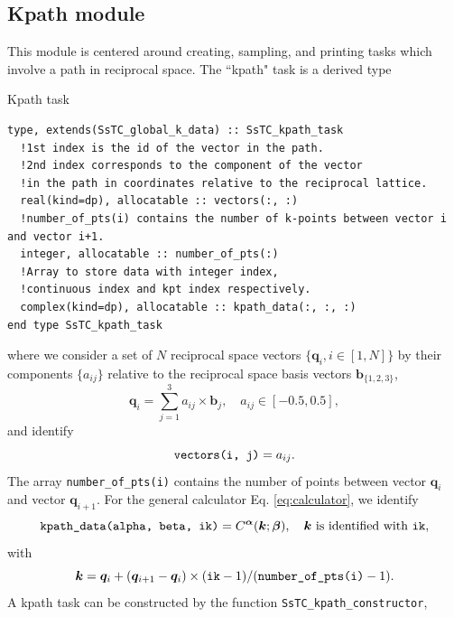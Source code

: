 \documentclass[10pt,a4paper]{article}
\begin{document}
\subsection{Kpath module}
This module is centered around creating, sampling, and printing tasks which involve a path in reciprocal space. The ``kpath" task is a derived type
\begin{codebox}{Kpath task}
\begin{lstlisting}[caption={Derived type corresponding to a ``kpath" task.},captionpos=b]
type, extends(SsTC_global_k_data) :: SsTC_kpath_task
  !1st index is the id of the vector in the path.
  !2nd index corresponds to the component of the vector
  !in the path in coordinates relative to the reciprocal lattice.
  real(kind=dp), allocatable :: vectors(:, :)
  !number_of_pts(i) contains the number of k-points between vector i and vector i+1.
  integer, allocatable :: number_of_pts(:)
  !Array to store data with integer index,
  !continuous index and kpt index respectively.
  complex(kind=dp), allocatable :: kpath_data(:, :, :)
end type SsTC_kpath_task
\end{lstlisting}
\end{codebox}
where we consider a set of $N$ reciprocal space vectors $\{\bm{q}_i, i\in[1, N]\}$ by their components $\{a_{ij}\}$ relative to the reciprocal space basis vectors $\bm{b}_{\{1, 2, 3\}}$,
\begin{equation}\label{eq:vec_coords_path}
\bm{q}_i = \sum_{j=1}^3 a_{ij}\times \bm{b}_j, \quad a_{ij}\in\left[-0.5, 0.5\right],
\end{equation}
and identify
\begin{equation}
\verb|vectors(i, j)| = a_{ij}.
\end{equation}
The array \verb|number_of_pts(i)| contains the number of points between vector $\bm{q}_i$ and vector $\bm{q}_{i+1}$. For the general calculator Eq. \eqref{eq:calculator}, we identify
\begin{equation}
\verb|kpath_data(alpha, beta, ik)| = C^{\bm{\alpha}}(\bm{k};\bm{\beta}),\quad \bm{k}\text{ is identified with } \verb|ik|,
\end{equation}
with
\begin{equation}
\bm{k} = \bm{q}_i + (\bm{q}_{i+1} - \bm{q}_i)\times (\verb|ik| - 1)/(\verb|number_of_pts(i)| - 1).
\end{equation}
A kpath task can be constructed by the function \verb|SsTC_kpath_constructor|,
\end{document}

